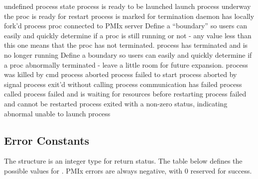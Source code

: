 \begin{constantdesc}
%
undefined process state
%
process is ready to be launched
%
launch process underway
%
the proc is ready for restart
%
process is marked for termination
%
daemon has locally fork'd process
%
proc connected to PMIx server
%
Define a ``boundary'' so users can easily and quickly determine  if a proc is still running or not - any value less than this one means that the proc has not terminated.
%
process has terminated and is no longer running
%
Define a boundary so users can easily and quickly determine if a proc abnormally terminated - leave a little room for future expansion.
%
process was killed by cmd
%
process aborted
%
process failed to start
%
process aborted by signal
%
process exit'd without calling 
%
process communication has failed
%
process called 
%
process failed and is waiting for resources before restarting
%
process failed and cannot be restarted
%
process exited with a non-zero status, indicating abnormal
%
unable to launch process
%
\end{constantdesc}


\subsection{Error Constants}
\label{api:struct:errors}

The  structure is an integer type for return status.
The table below defines the possible values for .
PMIx errors are always negative, with 0 reserved for success.

